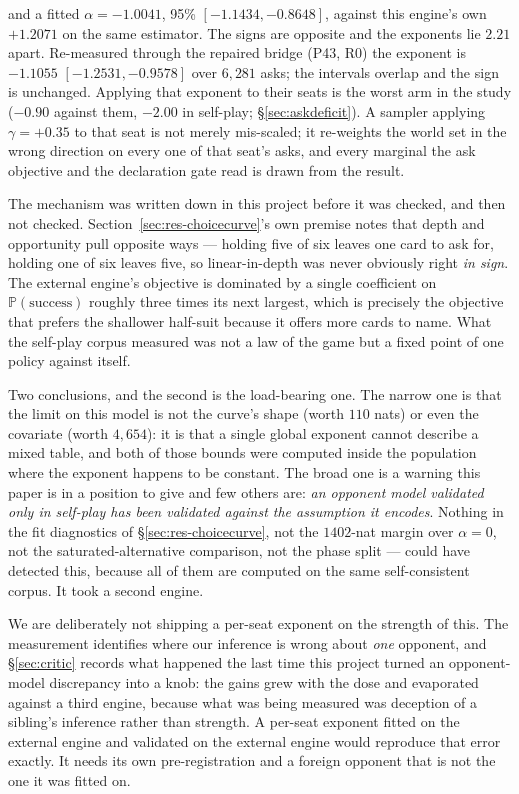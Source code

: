 \documentclass[11pt,letterpaper]{article}
\newcommand{\Prob}{\ensuremath{\mathbb{P}}}
\begin{document}
\noindent and a fitted $\alpha = \mathbf{-1.0041}$, 95\%
$[-1.1434, -0.8648]$, against this engine's own $+1.2071$ on the same
estimator. The signs are opposite and the exponents lie $2.21$ apart.
Re-measured through the repaired bridge (P43, R0) the exponent is $-1.1055$
$[-1.2531, -0.9578]$ over $6{,}281$ asks; the intervals overlap and the sign
is unchanged. Applying that exponent to their seats is the worst arm in the
study ($-0.90$ against them, $-2.00$ in self-play; \S\ref{sec:askdeficit}). A
sampler applying $\gamma = +0.35$ to that seat is not merely mis-scaled; it
re-weights the world set in the wrong direction on every one of that seat's
asks, and every marginal the ask objective and the declaration gate read is
drawn from the result.

The mechanism was written down in this project before it was checked, and then
not checked. Section~\ref{sec:res-choicecurve}'s own premise notes that depth
and opportunity pull opposite ways --- holding five of six leaves one card to
ask for, holding one of six leaves five, so linear-in-depth was never
obviously right \emph{in sign}. The external engine's objective is dominated by a single
coefficient on $\Prob(\text{success})$ roughly three times its next largest,
which is precisely the objective that prefers the shallower half-suit because
it offers more cards to name. What the self-play corpus measured was not a law
of the game but a fixed point of one policy against itself.

Two conclusions, and the second is the load-bearing one. The narrow one is
that the limit on this model is not the curve's shape (worth $110$ nats) or
even the covariate (worth $4{,}654$): it is that a single global exponent
cannot describe a mixed table, and both of those bounds were computed inside
the population where the exponent happens to be constant. The broad one is a
warning this paper is in a position to give and few others are: \emph{an
opponent model validated only in self-play has been validated against the
assumption it encodes}. Nothing in the fit diagnostics of
\S\ref{sec:res-choicecurve}, not the $1402$-nat margin over $\alpha = 0$,
not the saturated-alternative comparison, not the phase split --- could have
detected this, because all of them are computed on the same self-consistent
corpus. It took a second engine.

We are deliberately not shipping a per-seat exponent on the strength of this.
The measurement identifies where our inference is wrong about \emph{one}
opponent, and \S\ref{sec:critic} records what happened the last time this
project turned an opponent-model discrepancy into a knob: the gains grew with
the dose and evaporated against a third engine, because what was being
measured was deception of a sibling's inference rather than strength. A
per-seat exponent fitted on the external engine and validated on the external engine would reproduce that
error exactly. It needs its own pre-registration and a foreign opponent that
is not the one it was fitted on.
\end{document}
